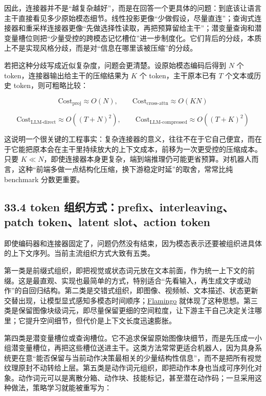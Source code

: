 因此，连接器并不是“越复杂越好”，而是在回答一个更具体的问题：到底该让语言主干直接看见多少原始模态细节。线性投影更像“少做假设，尽量直连”；查询式连接器和重采样连接器更像“先做选择性读取，再把预算留给主干”；潜变量查询和潜变量槽位则把“少量受控的跨模态记忆槽位”进一步制度化。它们背后的分歧，本质上不是实现风格分歧，而是对“信息在哪里该被压缩”的分歧。

若把这种分歧写成近似复杂度，问题会更清楚。设原始模态编码后得到 \(N\) 个 token，连接器输出给主干的压缩结果为 \(K\) 个 token，主干原本已有 \(T\) 个文本或历史 token，则可粗略比较：

\begingroup
\scriptsize
\begin{equation*}
\mathrm{Cost}_{\text{proj}} \approx O(N), \qquad
\mathrm{Cost}_{\text{cross-attn}} \approx O(KN)
\end{equation*}
\endgroup

\begingroup
\scriptsize
\begin{equation*}
\mathrm{Cost}_{\text{LLM-direct}} \approx O((T+N)^2), \qquad
\mathrm{Cost}_{\text{LLM-compressed}} \approx O((T+K)^2)
\end{equation*}
\endgroup

这说明一个很关键的工程事实：复杂连接器的意义，往往不在于它自己便宜，而在于它能把原本会在主干里持续放大的上下文成本，前移为一次更受控的压缩成本。只要 \(K \ll N\)，即使连接器本身更复杂，端到端推理仍可能更省预算。对机器人而言，这种“前端多做一点结构化压缩，换下游稳定时延”的取舍，常常比纯 benchmark 分数更重要。

\subsection*{33.4 token 组织方式：prefix、interleaving、patch token、latent slot、action token}


即使编码器和连接器固定了，问题仍然没有结束，因为模态表示还要被组织进具体的上下文序列。当前主流组织方式大致有五类。

第一类是前缀式组织，即把视觉或状态词元放在文本前面，作为统一上下文的前缀。这是最直观、实现也最简单的方式，特别适合“先看输入，再生成文字或动作”的自回归结构。第二类是交错式组织，即图像、视频帧、文本描述、状态更新交替出现，让模型显式感知多模态时间顺序；\href{https://arxiv.org/abs/2204.14198}{Flamingo} 就体现了这种思想。第三类是保留图像块级词元，即尽量保留更细的空间粒度，让下游主干自己决定关注哪里；它提升空间细节，但代价是上下文长度迅速膨胀。

第四类是潜变量槽位或查询槽位。它不追求保留原始图像块细节，而是先压成一小组潜变量槽位，再把这些槽位送进主干。这类方法常常更适合机器人，因为具身系统更在意“能否保留与当前动作决策最相关的少量结构性信息”，而不是把所有视觉纹理原封不动转给上层。第五类是动作词元组织，即把动作本身也当成可序列化对象。动作词元可以是离散分箱、动作块、技能标记，甚至潜在动作码；一旦采用这种做法，策略学习就能被重写为：

